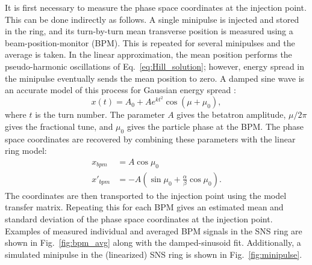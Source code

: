 It is first necessary to measure the phase space coordinates at the injection point. This can be done indirectly as follows. A single minipulse is injected and stored in the ring, and its turn-by-turn mean transverse position is measured using a beam-position-monitor (BPM). This is repeated for several minipulses and the average is taken. In the linear approximation, the mean position performs the pseudo-harmonic oscillations of Eq.~\eqref{eq:Hill_solution}; however, energy spread in the minipulse eventually sends the mean position to zero. A damped sine wave is an accurate model of this process for Gaussian energy spread \cite{Pelaia2016}:
%
\begin{equation}\label{eq:damped_sinusoid}
    x(t) = A_0 + A e^{kt^2} \cos{\left(\mu + \mu_0\right)},
\end{equation}
%
where $t$ is the turn number. The parameter $A$ gives the betatron amplitude, $\mu / 2\pi$ gives the fractional tune, and $\mu_0$ gives the particle phase at the BPM. The phase space coordinates are recovered by combining these parameters with the linear ring model:
%
\begin{equation}
\begin{aligned}
    x_{bpm} &= A \cos\mu_0 \\ 
    x'_{bpm} &= -A\left({\sin\mu_0 + \frac{\alpha}{\beta}\cos\mu_0}\right).
\end{aligned}
\end{equation}
%
The coordinates are then transported to the injection point using the model transfer matrix. Repeating this for each BPM gives an estimated mean and standard deviation of the phase space coordinates at the injection point. Examples of measured individual and averaged BPM signals in the SNS ring are shown in Fig.~\ref{fig:bpm_avg} along with the damped-sinusoid fit. Additionally, a simulated minipulse in the (linearized) SNS ring is shown in Fig.~\ref{fig:minipulse}.
%
